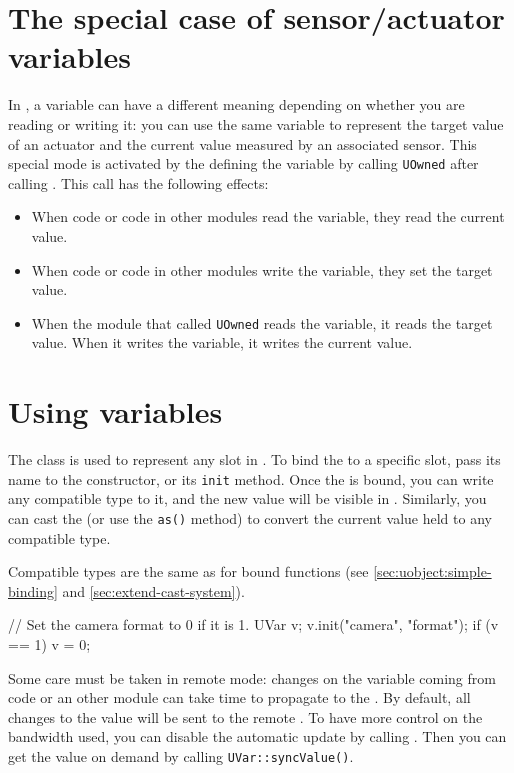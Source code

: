 \section{The special case of sensor/actuator variables}

In \urbi, a variable can have a different meaning depending on whether you
are reading or writing it: you can use the same variable to represent the
target value of an actuator and the current value measured by an associated
sensor. This special mode is activated by the \UObject defining the variable
by calling \lstinline{UOwned} after calling . This call
has the following effects:
\begin{itemize}
\item When \urbi code or code in other modules read the variable, they read
  the current value.
\item When \urbi code or code in other modules write the variable, they set
  the target value.
\item When the module that called \lstinline|UOwned| reads the variable, it
  reads the target value. When it writes the variable, it writes the current
  value.
\end{itemize}

\section{Using \urbi variables}

The \Cxx class \UVar is used to represent any \urbi slot in \Cxx.  To bind
the \UVar to a specific slot, pass its name to the \UVar constructor, or its
\lstinline|init| method.  Once the \UVar is bound, you can write any
compatible type to it, and the new value will be visible in \us.  Similarly,
you can cast the \UVar (or use the \lstinline{as()} method) to convert the
current \us value held to any compatible type.

Compatible types are the same as for bound functions (see
\autoref{sec:uobject:simple-binding} and \autoref{sec:extend-cast-system}).

\begin{cxx}
// Set the camera format to 0 if it is 1.
UVar v;
v.init("camera", "format");
if (v == 1)
 v = 0;
\end{cxx}

Some care must be taken in remote mode: changes on the variable coming from
\urbi code or an other module can take time to propagate to the \UVar. By
default, all changes to the value will be sent to the remote \UObject. To
have more control on the bandwidth used, you can disable the automatic
update by calling . Then you can get the value on demand
by calling \lstinline|UVar::syncValue()|.

